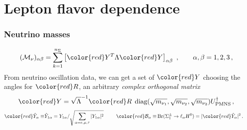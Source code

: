 \documentclass[%
xcolor=dvipsnames,table%
]{beamer}
\begin{document}
\section{Lepton flavor dependence}
\begin{frame}
  \frametitle{Neutrino masses}
  

\begin{align*}
  ({\mathcal{M}}_{\nu})_{\alpha\beta} =
\sum_{k=1}^{n_\Sigma} \left[{\color{red}Y^T} \Lambda {\color{red}Y}\right]_{\alpha\beta}~, \qquad  \alpha,\beta=1,2,3\,,
\end{align*}
From neutrino oscillation data, we can get a set of $\color{red}Y$ choosing the angles for $\color{red}R$, an arbitrary \emph{complex orthogonal matrix}
\begin{eqnarray}\label{eq:CasasIbarra}
{\color{red}Y} = \sqrt{\Lambda}^{-1} {\color{red}R}\;  
\operatorname{diag}( \sqrt{m_{\nu_{1}}}, \sqrt{m_{\nu_{2}}},\sqrt{m_{\nu_{3}}}  )
U_{\rm PMNS}^{\dagger}
\,,
\end{eqnarray}
\begin{align*}
{\color{red} \hat Y_{\alpha } } \equiv&\hat Y_{1\alpha} = {Y_{1\alpha}}/{ \sqrt{\sum_{\alpha=e,\mu,\tau} |Y_{1\alpha}|^2 }} &\hspace{0.5cm} {\color{red} \mathcal{B}_\alpha } \equiv &\operatorname{Br} (\Sigma_{1}^{\pm} \to \ell_\alpha H^{0}) = |{\color{red}\hat Y_\alpha}|^2\,.  
\end{align*}
\end{frame}
\end{document}
